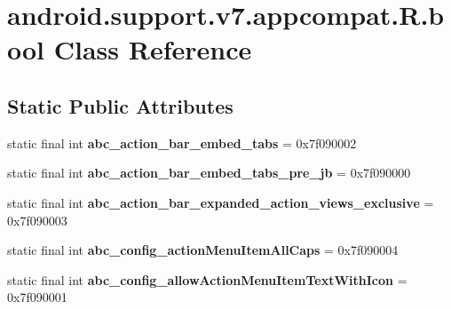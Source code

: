 \hypertarget{classandroid_1_1support_1_1v7_1_1appcompat_1_1_r_1_1bool}{}\section{android.\+support.\+v7.\+appcompat.\+R.\+bool Class Reference}
\label{classandroid_1_1support_1_1v7_1_1appcompat_1_1_r_1_1bool}
\subsection*{Static Public Attributes}
\begin{DoxyCompactItemize}
\item 
\hypertarget{classandroid_1_1support_1_1v7_1_1appcompat_1_1_r_1_1bool_a6db41ba5a7c26fd22cbf03d4d2b037a3}{}static final int {\bfseries abc\+\_\+action\+\_\+bar\+\_\+embed\+\_\+tabs} = 0x7f090002\label{classandroid_1_1support_1_1v7_1_1appcompat_1_1_r_1_1bool_a6db41ba5a7c26fd22cbf03d4d2b037a3}

\item 
\hypertarget{classandroid_1_1support_1_1v7_1_1appcompat_1_1_r_1_1bool_a3dfde94b8ab37f449dff575eea5b8faa}{}static final int {\bfseries abc\+\_\+action\+\_\+bar\+\_\+embed\+\_\+tabs\+\_\+pre\+\_\+jb} = 0x7f090000\label{classandroid_1_1support_1_1v7_1_1appcompat_1_1_r_1_1bool_a3dfde94b8ab37f449dff575eea5b8faa}

\item 
\hypertarget{classandroid_1_1support_1_1v7_1_1appcompat_1_1_r_1_1bool_a0c8aef1f072e562a889c0e9c3dddbac1}{}static final int {\bfseries abc\+\_\+action\+\_\+bar\+\_\+expanded\+\_\+action\+\_\+views\+\_\+exclusive} = 0x7f090003\label{classandroid_1_1support_1_1v7_1_1appcompat_1_1_r_1_1bool_a0c8aef1f072e562a889c0e9c3dddbac1}

\item 
\hypertarget{classandroid_1_1support_1_1v7_1_1appcompat_1_1_r_1_1bool_ad6fe2e82a81c57a39a1cf48ac06ea06a}{}static final int {\bfseries abc\+\_\+config\+\_\+action\+Menu\+Item\+All\+Caps} = 0x7f090004\label{classandroid_1_1support_1_1v7_1_1appcompat_1_1_r_1_1bool_ad6fe2e82a81c57a39a1cf48ac06ea06a}

\item 
\hypertarget{classandroid_1_1support_1_1v7_1_1appcompat_1_1_r_1_1bool_afec56b0d2646ac026be399ffd64223ce}{}static final int {\bfseries abc\+\_\+config\+\_\+allow\+Action\+Menu\+Item\+Text\+With\+Icon} = 0x7f090001\label{classandroid_1_1support_1_1v7_1_1appcompat_1_1_r_1_1bool_afec56b0d2646ac026be399ffd64223ce}


\end{DoxyCompactItemize}
